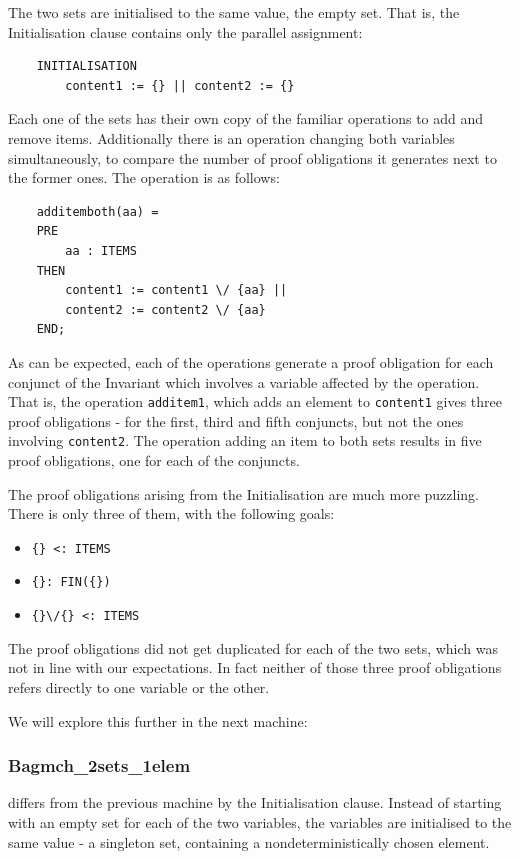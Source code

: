 \documentclass[12pt,journal,duplex]{IEEEtran}
\begin{document}
	The two sets are initialised to the same value, the empty set. That is, the Initialisation clause contains only the parallel assignment:
	\begin{lstlisting}
	INITIALISATION
		content1 := {} || content2 := {}
	\end{lstlisting}

	Each one of the sets has their own copy of the familiar operations to add and remove items. Additionally there is an operation changing both variables simultaneously, to compare the number of proof obligations it generates next to the former ones. The operation is as follows:

	\begin{lstlisting}
	additemboth(aa) =
	PRE
		aa : ITEMS
	THEN
		content1 := content1 \/ {aa} ||
		content2 := content2 \/ {aa}
	END;
	\end{lstlisting}

	As can be expected, each of the operations generate a proof obligation for each conjunct of the Invariant which involves a variable affected by the operation. That is, the operation \texttt{additem1}, which adds an element to \texttt{content1} gives three proof obligations - for the first, third and fifth conjuncts, but not the ones involving \texttt{content2}. The operation adding an item to both sets results in five proof obligations, one for each of the conjuncts.

	The proof obligations arising from the Initialisation are much more puzzling. There is only three of them, with the following goals:
	\begin{itemize}
		\item \verb|{} <: ITEMS |
		\item \verb|{}: FIN({}) |
		\item \verb|{}\/{} <: ITEMS|
	\end{itemize}
	The proof obligations did not get duplicated for each of the two sets, which was not in line with our expectations. In fact neither of those three proof obligations refers directly to one variable or the other.

	We will explore this further in the next machine:

	\subsubsection{Bagmch\_2sets\_1elem} differs from the previous machine by the Initialisation clause. Instead of starting with an empty set for each of the two variables, the variables are initialised to the same value - a singleton set, containing a nondeterministically chosen element.
\end{document}
